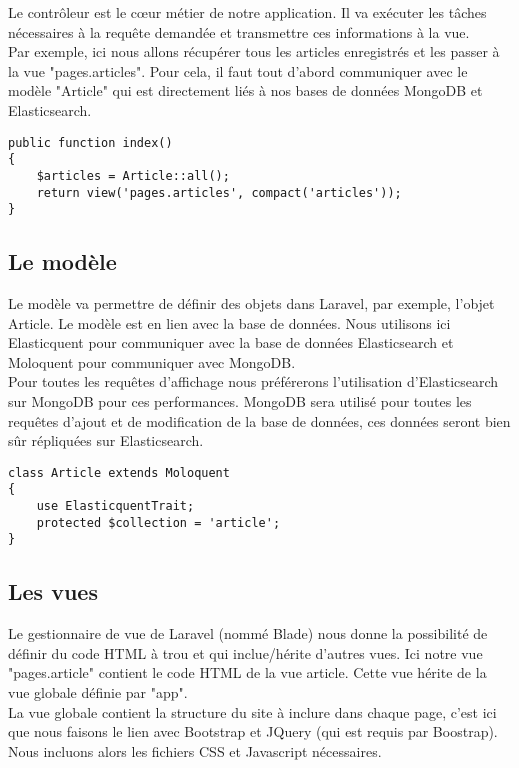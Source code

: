Le contrôleur est le cœur métier de notre application. Il va exécuter les tâches nécessaires à la requête demandée et transmettre ces informations à la vue.\\
Par exemple, ici nous allons récupérer tous les articles enregistrés et les passer à la vue "pages.articles". Pour cela, il faut tout d'abord communiquer avec le modèle "Article" qui est directement liés à nos bases de données MongoDB et Elasticsearch.

\begin{verbatim}
public function index()
{
    $articles = Article::all();
    return view('pages.articles', compact('articles'));
}
\end{verbatim}

\subsection{Le modèle}
Le modèle va permettre de définir des objets dans Laravel, par exemple, l'objet Article. Le modèle est en lien avec la base de données. Nous utilisons ici Elasticquent\cite{GitElasticquent} pour communiquer avec la base de données Elasticsearch et Moloquent\cite{GitLaravelMongo} pour communiquer avec MongoDB.\\ Pour toutes les requêtes d'affichage nous préférerons l'utilisation d'Elasticsearch sur MongoDB pour ces performances. MongoDB sera utilisé pour toutes les requêtes d'ajout et de modification de la base de données, ces données seront bien sûr répliquées sur Elasticsearch.

\begin{verbatim}
class Article extends Moloquent
{
    use ElasticquentTrait;
    protected $collection = 'article';
}
\end{verbatim}

\subsection{Les vues}
\label{subsec:vues}

Le gestionnaire de vue de Laravel (nommé Blade) nous donne la possibilité de définir du code HTML à trou et qui inclue/hérite d'autres vues. Ici notre vue "pages.article" contient le code HTML de la vue article. Cette vue hérite de la vue globale définie par "app".\\
La vue globale contient la structure du site à inclure dans chaque page, c'est ici que nous faisons le lien avec Bootstrap\cite{Bootstrap} et JQuery (qui est requis par Boostrap). Nous incluons alors les fichiers CSS et Javascript nécessaires.

